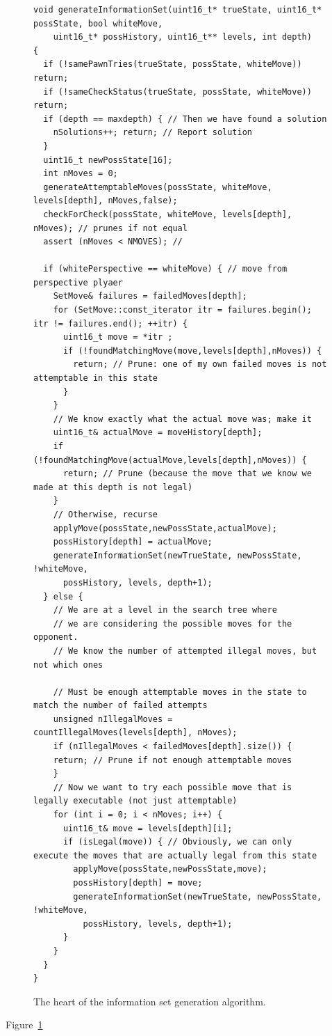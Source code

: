 \documentclass[11pt]{article}
\begin{document}
\begin{figure}
\begin{lstlisting}
void generateInformationSet(uint16_t* trueState, uint16_t* possState, bool whiteMove, 
	uint16_t* possHistory, uint16_t** levels, int depth)
{
  if (!samePawnTries(trueState, possState, whiteMove)) return;  
  if (!sameCheckStatus(trueState, possState, whiteMove)) return; 
  if (depth == maxdepth) { // Then we have found a solution
	nSolutions++; return; // Report solution
  }
  uint16_t newPossState[16]; 
  int nMoves = 0;
  generateAttemptableMoves(possState, whiteMove, levels[depth], nMoves,false);
  checkForCheck(possState, whiteMove, levels[depth], nMoves); // prunes if not equal
  assert (nMoves < NMOVES); // 

  if (whitePerspective == whiteMove) { // move from perspective plyaer 
    SetMove& failures = failedMoves[depth];
    for (SetMove::const_iterator itr = failures.begin(); itr != failures.end(); ++itr) {
      uint16_t move = *itr ;
      if (!foundMatchingMove(move,levels[depth],nMoves)) {
        return; // Prune: one of my own failed moves is not attemptable in this state
      }
    }
    // We know exactly what the actual move was; make it
    uint16_t& actualMove = moveHistory[depth];
    if (!foundMatchingMove(actualMove,levels[depth],nMoves)) {
      return; // Prune (because the move that we know we made at this depth is not legal)
    }
    // Otherwise, recurse 
    applyMove(possState,newPossState,actualMove);
    possHistory[depth] = actualMove;
    generateInformationSet(newTrueState, newPossState, !whiteMove, 
      possHistory, levels, depth+1);
  } else { 
    // We are at a level in the search tree where 
    // we are considering the possible moves for the opponent.
    // We know the number of attempted illegal moves, but not which ones

    // Must be enough attemptable moves in the state to match the number of failed attempts
    unsigned nIllegalMoves = countIllegalMoves(levels[depth], nMoves);
    if (nIllegalMoves < failedMoves[depth].size()) {
	return; // Prune if not enough attemptable moves
    }
    // Now we want to try each possible move that is legally executable (not just attemptable) 
    for (int i = 0; i < nMoves; i++) {
      uint16_t& move = levels[depth][i];
      if (isLegal(move)) { // Obviously, we can only execute the moves that are actually legal from this state
        applyMove(possState,newPossState,move);
        possHistory[depth] = move;
        generateInformationSet(newTrueState, newPossState, !whiteMove, 
          possHistory, levels, depth+1);
      }
    }
  }
}
\end{lstlisting}
\caption{The heart of the information set generation algorithm.}
\label{codelisting}
\end{figure}

Figure~\ref{codelisting}
\end{document}
